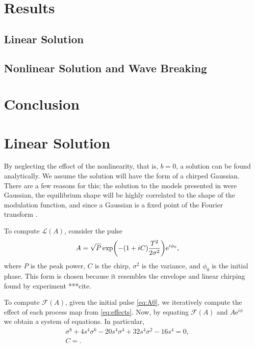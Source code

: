 \documentclass[10pt,twocolumn,a4paper]{article}
\let\originalleft\left
\let\originalright\right
\renewcommand{\left}{\mathopen{}\mathclose\bgroup\originalleft}
\renewcommand{\right}{\aftergroup\egroup\originalright}
\begin{document}
\section{Results}

\subsection{Linear Solution}

\subsection{Nonlinear Solution and Wave Breaking}

\section{Conclusion}


\clearpage
\newpage




\section{Linear Solution}
By neglecting the effoct of the nonlinearity, that is, $b = 0$, a solution can be found analytically. We assume the solution will have the form of a chirped Gaussian. There are a few reasons for this; the solution to the models presented in \cite{cutler, siegman, kuizenga1970a, martinez1984, martinez1985} were Gaussian, the equilibrium shape will be highly correlated to the shape of the modulation function, and since a Gaussian is a fixed point of the Fourier transform \cite{gradshteyn}.

To compute $\mathcal{L}(A)$, consider the pulse
\begin{align}
	A = \sqrt{P} \exp \left( -(1 + iC) \frac{T^2}{2 \sigma^2} \right) \textrm{e}^{i \phi_0},
	\label{eq:A0}
\end{align}
where $P$ is the peak power, $C$ is the chirp, $\sigma^2$ is the variance, and $\phi_0$ is the initial phase. This form is chosen because it resembles the envelope and linear chirping found by experiment ***cite. 

To compute $\mathcal{F}(A)$, given the initial pulse \eqref{eq:A0}, we iteratively compute the effect of each process map from \eqref{eq:effects}. Now, by equating $\mathcal{F}(A)$ and $A \textrm{e}^{i \phi}$ we obtain a system of equations. In particular, 
\begin{align}
	\sigma^8 + 4 s^4 \sigma^6 - 20 s^4 \sigma^4 + 32 s^4 \sigma^2 - 16 s^4 = 0, \label{eq:var} \\
	C = .
	\label{eq:chirp}
\end{align}
\end{document}
